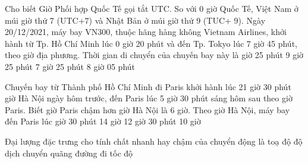 \begin{ex}
		\loigiai{
		}
\end{ex}

\begin{ex}
	Cho biết Giờ Phối hợp Quốc Tế gọi tắt UTC. So với 0 giờ Quốc Tế, Việt Nam ở múi giờ thứ 7 (UTC+7) và Nhật Bản ở múi giờ thứ 9 (TUC+ 9). Ngày 20/12/2021, máy bay VN300, thuộc hãng hàng không Vietnam Airlines, khởi hành từ Tp. Hồ Chí Minh lúc 0 giờ 20 phút và đến Tp. Tokyo lúc 7 giờ 45 phút, theo giờ địa phương. Thời gian di chuyển của chuyến bay này là
	\choice
	{ giờ 25 phút}
	{9 giờ 25 phút}
	{7 giờ 25 phút}
	{8 giờ 05 phút}
	\loigiai{
	}
\end{ex}

\begin{ex}
	Chuyến bay từ Thành phố Hồ Chí Minh đi Paris khởi hành lúc 21 giờ 30 phút giờ Hà Nội ngày hôm trước, đến Paris lúc 5 giờ 30 phút sáng hôm sau theo giờ Paris. Biết giờ Paris chậm hơn giờ Hà Nội là 6 giờ. Theo giờ Hà Nội, máy bay đến Paris lúc
	\choice
	{ giờ 30 phút}
	{14 giờ}
	{12 giờ 30 phút}
	{10 giờ}
	\loigiai{
	}
\end{ex}
\begin{ex}
	Đại lượng đặc trưng cho tính chất nhanh hay chậm của chuyển động là 
	\choice
	{toạ độ}
	{độ dịch chuyển}
	{quãng đường đi}
	{\True tốc độ}
	\loigiai{
	}
\end{ex}

